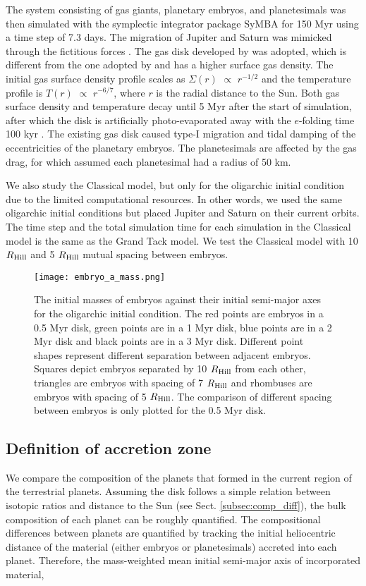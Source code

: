 \documentclass{aa}
\begin{document}
The system consisting of gas giants, planetary embryos, and planetesimals was then simulated with the symplectic integrator package SyMBA \citep{duncan1998multiple} for 150 Myr using a time step of 7.3 days. The migration of Jupiter and Saturn was mimicked through the fictitious forces \citep{walsh2011low}. The gas disk developed by \cite{bitsch2015structure} was adopted, which is different from the one adopted by \cite{walsh2011low} and has a higher surface gas density. The initial gas surface density profile scales as $\Sigma(r)$ $\propto$ $r^{-1/2}$ and the temperature profile is $T(r)$ $\propto$  $r^{-6/7}$, where $r$ is the radial distance to the Sun. Both gas surface density and temperature decay until 5 Myr after the start of simulation, after which the disk is artificially photo-evaporated away with the $e$-folding time 100 kyr \citep{bitsch2014stellar}. The existing gas disk caused type-I migration and tidal damping of the eccentricities of the planetary embryos. The planetesimals are affected by the gas drag, for which \cite{brasser2016analysis} assumed each planetesimal had a radius of 50 km.

We also study the Classical model, but only for the oligarchic initial condition due to the limited computational resources. In other words, we used the same oligarchic initial conditions but placed Jupiter and Saturn on their current orbits. The time step and the total simulation time for each simulation in the Classical model is the same as the Grand Tack model. We test the Classical model with 10 $R_{\rm Hill}$ and 5 $R_{\rm Hill}$ mutual spacing between embryos.

\begin{figure*}
\sidecaption
\texttt{[image: embryo\_a\_mass.png]}
\caption{The initial masses of embryos against their initial semi-major axes for the oligarchic initial condition. The red points are embryos in a 0.5 Myr disk, green points are in a 1 Myr disk, blue points are in a 2 Myr disk and black points are in a 3 Myr disk. Different point shapes represent different separation between adjacent embryos. Squares depict embryos separated by 10 $R_{\rm Hill}$ from each other, triangles are embryos with spacing of 7 $R_{\rm Hill}$ and rhombuses are embryos with spacing of 5 $R_{\rm Hill}$. The comparison of different spacing between embryos is only plotted for the 0.5 Myr disk.}
\label{fig:em_a_mass}
\end{figure*}

\subsection{Definition of accretion zone}
\label{subsec:defin_accret}
We compare the composition of the planets that formed in the current region of the terrestrial planets. Assuming the disk follows a simple relation between isotopic ratios and distance to the Sun (see Sect. \ref{subsec:comp_diff}), the bulk composition of each planet can be roughly quantified. The compositional differences between planets are quantified by tracking the initial heliocentric distance of the material (either embryos or planetesimals) accreted into each planet. Therefore, the mass-weighted mean initial semi-major axis of incorporated material,
\end{document}
